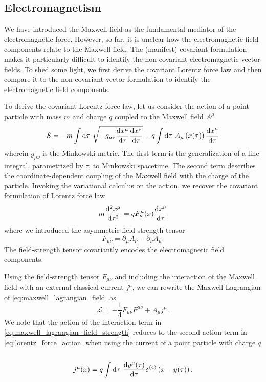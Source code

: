 \subsection{Electromagnetism}

We have introduced the Maxwell field as the fundamental mediator of the electromagnetic force.
However, so far, it is unclear how the electromagnetic field components relate to the Maxwell field.
The (manifest) covariant formulation makes it particularly difficult to identify the non-covariant electromagnetic vector fields.
To shed some light, we first derive the covariant Lorentz force law and then compare it to the non-covariant vector formulation to identify the electromagnetic field components.

To derive the covariant Lorentz force law, let us consider the action of a point particle with mass $m$ and charge $q$ coupled to the Maxwell field $A^\mu$~\cite[p.~244]{Zee2013}
\begin{equation}
	S
	=
	-
	m\int\dd{\tau}
	\sqrt{-g_{\mu\nu}\odv{x^\mu}{\tau}\odv{x^\nu}{\tau}}
	+
	q\int\dd{\tau}
	A_\mu\left(x(\tau)\right)
	\odv{x^\mu}{\tau}
	\label{eq:lorentz_force_action}
\end{equation}
wherein $g_{\mu\nu}$ is the Minkowski metric.
The first term is the generalization of a line integral, parametrized by $\tau$, to Minkowski spacetime.
The second term describes the coordinate-dependent coupling of the Maxwell field with the charge of the particle.
Invoking the variational calculus on the action, we recover the covariant formulation of Lorentz force law
\begin{equation}
	m
	\odv[order={2}]{x^\mu}{\tau}
	=
	qF^\mu_\nu(x)\odv{x^\nu}{\tau}
	\label{eq:covariant_lorentz_force}
\end{equation}
where we introduced the asymmetric field-strength tensor
\begin{equation}
	F_{\mu\nu}
	=
	\partial_\mu
	A_\nu
	-
	\partial_\nu
	A_\mu
	\label{eq:field_strength_tensor}
	.
\end{equation}
The field-strength tensor covariantly encodes the electromagnetic field components.

Using the field-strength tensor $F_{\mu\nu}$ and including the interaction of the Maxwell field with an external classical current $j^\mu$, we can rewrite the Maxwell Lagrangian of \cref{eq:maxwell_lagrangian_field} as
\begin{equation}
	\mathcal{L}
	=
	-
	\frac{1}{4}
	F_{\mu\nu}
	F^{\mu\nu}
	+
	A_\mu j^\mu
	\label{eq:maxwell_lagrangian_field_strength}
	.
\end{equation}
We note that the action of the interaction term in \cref{eq:maxwell_lagrangian_field_strength} reduces to the second action term in \cref{eq:lorentz_force_action} when using the current of a point particle with charge $q$~\cite[p.~177]{Peskin1995}
\begin{equation}
	j^\mu(x)
	=
	q
	\int\dd{\tau}
	\odv{y^\mu(\tau)}{\tau}
	\delta^{(4)}\left(x-y(\tau)\right)
	.
\end{equation}

